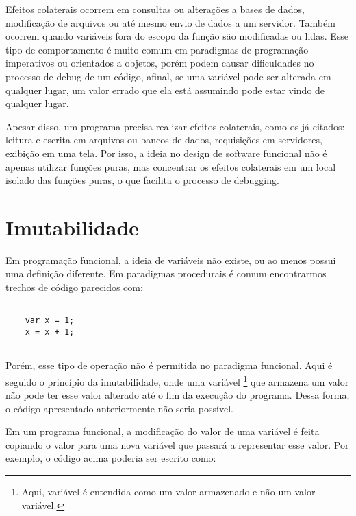 Efeitos colaterais ocorrem em consultas ou 
alterações a bases de dados, modificação de 
arquivos ou até mesmo envio de dados a um 
servidor\cite{purefunctionscala, functionalscala}. 
Também ocorrem quando variáveis fora 
do escopo da função são modificadas ou lidas. 
Esse tipo de comportamento é muito comum em 
paradigmas de programação imperativos ou 
orientados a objetos, porém 
podem causar dificuldades no processo de 
debug de um código, afinal, se uma variável 
pode ser alterada em qualquer lugar, um 
valor errado que ela está assumindo pode 
estar vindo de qualquer lugar.

Apesar disso, um programa precisa realizar 
efeitos colaterais, como os já citados: 
leitura e escrita em arquivos ou bancos de 
dados, requisições em servidores, exibição em 
uma tela. Por isso, a ideia no design de software 
funcional não é apenas utilizar funções puras, 
mas concentrar os efeitos colaterais em um local 
isolado das funções puras, o que facilita o 
processo de debugging\cite{purefunctionscala}.



\section{Imutabilidade}

Em programação funcional, a ideia de variáveis não 
existe, ou ao menos possui uma definição diferente\cite{braveclojure}.
Em paradigmas procedurais é comum encontrarmos trechos 
de código parecidos com:

\begin{lstlisting}[caption={Exemplo de Código Mutável},label=mutablevar]

    var x = 1;
    x = x + 1;


\end{lstlisting}

Porém, esse tipo de operação não é permitida no 
paradigma funcional. Aqui é seguido o princípio 
da imutabilidade, onde uma variável \footnote{Aqui, 
variável é entendida como um valor armazenado 
e não um valor variável.} que armazena um valor 
não pode ter esse valor alterado até o fim da 
execução do programa. Dessa forma, 
o código apresentado anteriormente não seria 
possível.

Em um programa funcional, a modificação do valor 
de uma variável é feita copiando o valor para uma 
nova variável que passará a representar esse valor\cite{functionalscala}.
Por exemplo, o código acima poderia ser escrito 
como:

